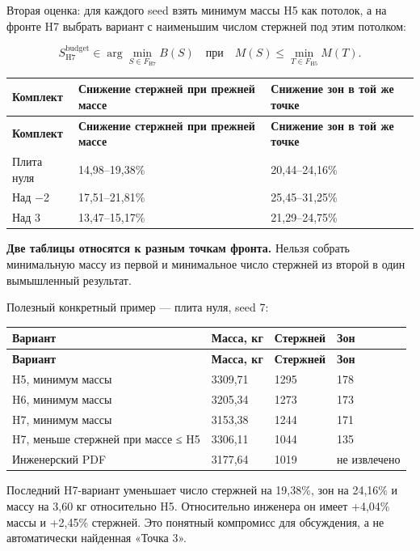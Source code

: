 \documentclass[11pt,a4paper]{article}
\begin{document}
Вторая оценка: для каждого seed взять минимум массы H5 как потолок, а на фронте H7 выбрать вариант с наименьшим числом стержней под этим потолком:


\[
S_{\mathrm{H7}}^{\mathrm{budget}}\in\arg\min_{S\in F_{\mathrm{H7}}}B(S)
\quad\text{при}\quad M(S)\le\min_{T\in F_{\mathrm{H5}}}M(T).
\]

{\small\setlength{\tabcolsep}{4pt}
\begin{longtable}{@{}L{41.178mm}L{63.351mm}L{53.848mm}@{}}
\toprule
\textbf{Комплект} & \textbf{Снижение стержней при прежней массе} & \textbf{Снижение зон в той же точке} \\
\midrule\endfirsthead
\toprule
\textbf{Комплект} & \textbf{Снижение стержней при прежней массе} & \textbf{Снижение зон в той же точке} \\
\midrule\endhead
\bottomrule\endfoot
Плита нуля & 14,98–19,38\% & 20,44–24,16\% \\
Над −2 & 17,51–21,81\% & 25,45–31,25\% \\
Над 3 & 13,47–15,17\% & 21,29–24,75\% \\
\end{longtable}}

\textbf{Две таблицы относятся к разным точкам фронта.} Нельзя собрать минимальную массу из первой и минимальное число стержней из второй в один вымышленный результат.


Полезный конкретный пример — плита нуля, seed 7:


{\small\setlength{\tabcolsep}{4pt}
\begin{longtable}{@{}L{52.892mm}L{35.780mm}L{35.780mm}L{31.113mm}@{}}
\toprule
\textbf{Вариант} & \textbf{Масса, кг} & \textbf{Стержней} & \textbf{Зон} \\
\midrule\endfirsthead
\toprule
\textbf{Вариант} & \textbf{Масса, кг} & \textbf{Стержней} & \textbf{Зон} \\
\midrule\endhead
\bottomrule\endfoot
H5, минимум массы & 3309,71 & 1295 & 178 \\
H6, минимум массы & 3205,34 & 1273 & 173 \\
H7, минимум массы & 3153,38 & 1244 & 171 \\
H7, меньше стержней при массе ≤ H5 & 3306,11 & 1044 & 135 \\
Инженерский PDF & 3177,64 & 1019 & не извлечено \\
\end{longtable}}

Последний H7-вариант уменьшает число стержней на 19,38\%, зон на 24,16\% и массу на 3,60 кг относительно H5. Относительно инженера он имеет +4,04\% массы и +2,45\% стержней. Это понятный компромисс для обсуждения, а не автоматически найденная «Точка 3».
\end{document}
